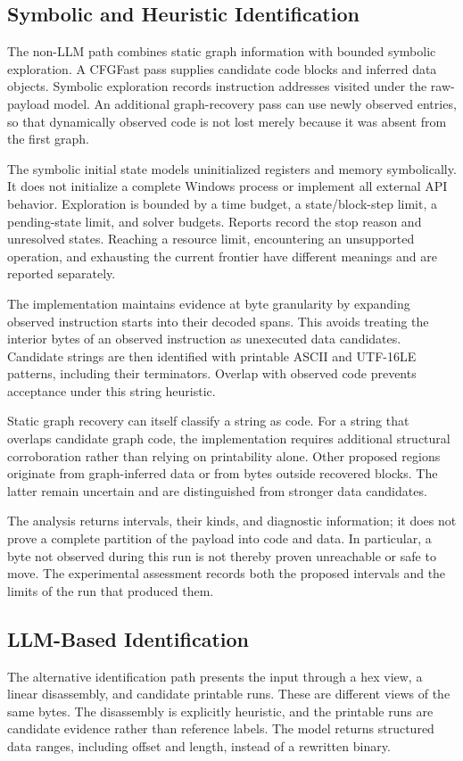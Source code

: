\subsection{Symbolic and Heuristic Identification}
The non-LLM path combines static graph information with bounded symbolic
exploration. A CFGFast pass supplies candidate code blocks and inferred
data objects. Symbolic exploration records instruction addresses visited
under the raw-payload model. An additional graph-recovery pass can use
newly observed entries, so that dynamically observed code is not lost
merely because it was absent from the first graph.

The symbolic initial state models uninitialized registers and memory
symbolically. It does not initialize a complete Windows process or
implement all external API behavior. Exploration is bounded by a time
budget, a state/block-step limit, a pending-state limit, and solver
budgets. Reports record the stop reason and unresolved states. Reaching
a resource limit, encountering an unsupported operation, and exhausting
the current frontier have different meanings and are reported
separately.

The implementation maintains evidence at byte granularity by expanding
observed instruction starts into their decoded spans. This avoids
treating the interior bytes of an observed instruction as unexecuted
data candidates. Candidate strings are then identified with printable
ASCII and UTF-16LE patterns, including their terminators. Overlap with
observed code prevents acceptance under this string heuristic.

Static graph recovery can itself classify a string as code. For a
string that overlaps candidate graph code, the implementation requires
additional structural corroboration rather than relying on printability
alone. Other proposed regions originate from graph-inferred data or
from bytes outside recovered blocks. The latter remain uncertain and
are distinguished from stronger data candidates.

The analysis returns intervals, their kinds, and diagnostic information;
it does not prove a complete partition of the payload into code and
data. In particular, a byte not observed during this run is not thereby
proven unreachable or safe to move. The experimental assessment records
both the proposed intervals and the limits of the run that produced them.

\subsection{LLM-Based Identification}
The alternative identification path presents the input through a hex
view, a linear disassembly, and candidate printable runs. These are
different views of the same bytes. The disassembly is explicitly
heuristic, and the printable runs are candidate evidence rather than
reference labels. The model returns structured data ranges, including
offset and length, instead of a rewritten binary.

